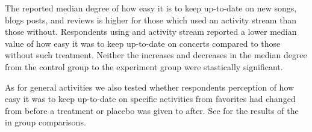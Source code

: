 The reported median degree of how easy it is to keep up-to-date
on new songs, blogs posts, and reviews is higher for those
which used an activity stream than those without. Respondents using
and activity stream reported a lower median value of how easy it was
to keep up-to-date on concerts compared to those without such treatment.
Neither the increases and decreases in the median degree from the
control group to the experiment group were stastically significant.

As for general activities we also tested whether respondents perception
of how easy it was to keep up-to-date on specific activities from
favorites had changed from before a treatment or placebo was given to after.
See 
 for the results of the
in group comparisons.

